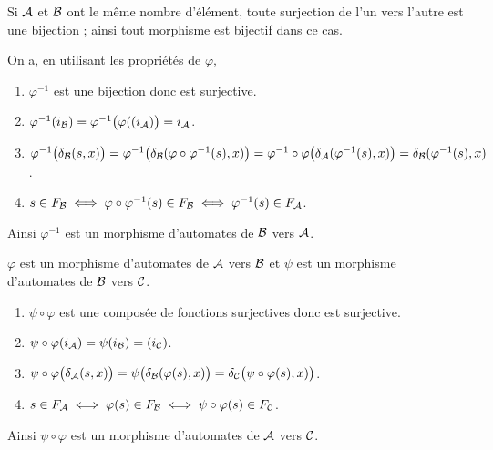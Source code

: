 \begin{Exercise}[label = ques:isom]
Si $\cal A$ et $\cal B$ ont le même nombre d'élément, toute surjection de l'un vers l'autre est une bijection ; ainsi tout morphisme est bijectif dans ce cas.

On a, en utilisant les propriétés de $\varphi$,
\begin{enumerate}
  \item $\varphi^{-1}$ est une bijection donc est surjective.
  \item $\varphi^{-1}(i_{\cal B}) = \varphi^{-1}\bigl(\varphi((i_{\cal A})\bigr)=i_{\cal A}$.
  \item $\varphi^{-1}\bigl(\delta_{\cal B}(s, x)\bigr) = \varphi^{-1}\bigl(\delta_{\cal B}(\varphi\circ\varphi^{-1}(s), x)\bigr)
  =\varphi^{-1}\circ \varphi\bigl(\delta_{\cal A}(\varphi^{-1}(s), x)\bigr)
  =\delta_{\cal B}(\varphi^{-1}(s), x)$.
  \item $s\in F_{\cal B} \iff \varphi\circ\varphi^{-1}(s)\in F_{\cal B} \iff \varphi^{-1}(s)\in F_{\cal A}$.
\end{enumerate}
Ainsi $\varphi^{-1}$ est un morphisme d'automates de ${\cal B}$ vers ${\cal A}$.
\end{Exercise}
\begin{Exercise}
$\varphi$ est un morphisme d'automates de ${\cal A}$ vers ${\cal B}$ et $\psi$ est un morphisme d'automates de ${\cal B}$ vers ${\cal C}$.
\begin{enumerate}
\item $\psi\circ\varphi$ est une composée de fonctions surjectives donc est surjective.
\item $\psi\circ\varphi(i_{\cal A}) = \psi(i_{\cal B}) = (i_{\cal C})$.
\item $\psi\circ\varphi\bigl(\delta_{\cal A}(s, x)\bigr)
=\psi\bigl(\delta_{\cal B}(\varphi(s), x)\bigr)
=\delta_{\cal C}\bigl(\psi\circ\varphi(s), x)\bigr)$.
  \item $s\in F_{\cal A} \iff \varphi(s)\in F_{\cal B} \iff \psi\circ\varphi(s)\in F_{\cal C}$.
\end{enumerate}
Ainsi $\psi\circ\varphi$ est un morphisme d'automates de ${\cal A}$ vers ${\cal C}$.
\end{Exercise}
